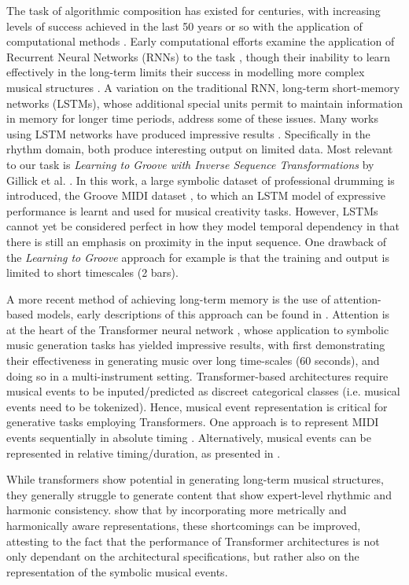 \documentclass[sigconf]{nimeart}
\begin{document}
The task of algorithmic composition has existed for centuries, with increasing levels of success achieved in the last 50 years or so with the application of computational methods \cite{c10,c11,c12}. Early computational efforts examine the application of Recurrent Neural Networks (RNNs) to the task \cite{c11,c13,c14,c15}, though their inability to learn effectively in the long-term limits their success in modelling more complex musical structures \cite{c16}. A variation on the traditional RNN, long-term short-memory networks (LSTMs), whose additional special units permit to maintain information in memory for longer time periods, address some of these issues. Many works using LSTM networks have produced impressive results \cite{c17,c18,c19,c20,c21}. Specifically in the rhythm domain, \cite{c22,c23} both produce interesting output on limited data. Most relevant to our task is \emph{Learning to Groove with Inverse Sequence Transformations} by Gillick et al. \cite{c9}. In this work, a large symbolic dataset of professional drumming is introduced, the Groove MIDI dataset \cite{c9}, to which an LSTM model of expressive performance is learnt and used for musical creativity tasks. However, LSTMs cannot yet be considered perfect in how they model temporal dependency in that there is still an emphasis on proximity in the input sequence. One drawback of the \emph{Learning to Groove} approach for example is that the training and output is limited to short timescales (2 bars).

A more recent method of achieving long-term memory is the use of attention-based models, early descriptions of this approach can be found in \cite{c1,c24,c25}. Attention is at the heart of the Transformer neural network \cite{c2}, whose application to symbolic music generation tasks has yielded impressive results, with \cite{c7} first demonstrating their effectiveness in generating music over long time-scales (60 seconds), and \cite{c8} doing so in a multi-instrument setting. Transformer-based architectures require musical events to be inputed/predicted as discreet categorical classes (i.e. musical events need to be tokenized). Hence, musical event representation is critical for generative tasks employing Transformers. One approach is to represent MIDI events sequentially in absolute timing \cite{c7}. Alternatively, musical events can be represented in relative timing/duration, as presented in \cite{c26,c27,c28}.

While transformers show potential in generating long-term musical structures, they generally struggle to generate content that show expert-level rhythmic and harmonic consistency. \cite{c26,c27,c28} show that by incorporating more metrically and harmonically aware representations, these shortcomings can be improved, attesting to the fact that the performance of Transformer architectures is not only dependant on the architectural specifications, but rather also on the representation of the symbolic musical events.
\end{document}
